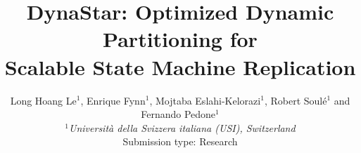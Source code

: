 \documentclass[svgnames,sigplan,10pt]{IEEEtran}
\newcommand{\dynastar}{\mbox{DynaStar}\xspace}
\begin{document}
\title{\dynastar: Optimized Dynamic Partitioning for\\ Scalable State Machine Replication}
\author{Long Hoang Le$^1$, Enrique Fynn$^1$, Mojtaba Eslahi-Kelorazi$^1$, Robert Soul\'{e}$^1$ and Fernando Pedone$^1$ \\
\small {\em  $^1$Universit\`{a} della Svizzera italiana (USI), Switzerland} \\ [2mm]
\small Submission type: Research
}
\date{}
\maketitle


\begin{abstract}
  
\end{abstract}










%



%




\end{document}
